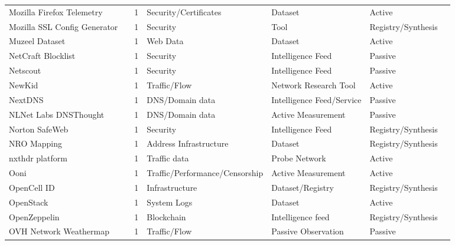 \documentclass[11pt,a4paper]{article}
\begin{document}
\begin{longtable}{@{}p{}p{}p{}p{}p{}p{}p{}@{}}
Mozilla Firefox Telemetry & \cite{mozillatelemetry} & 1 & Security/Certificates & Dataset & Active & \cite{10.1145/3777912.3839820} \\
Mozilla SSL Config Generator & \cite{sslgenerator} & 1 & Security & Tool & Registry/Synthesis & \cite{10.1007/978-3-031-28486-1_6} \\
Muzeel Dataset & \cite{10.1145/3517745.3561427} & 1 & Web Data & Dataset & Active & \cite{10.1145/3777912.3839817} \\
NetCraft Blocklist & \cite{netcraft} & 1 & Security & Intelligence Feed & Passive & \cite{10.1007/978-3-030-98785-5_1} \\
Netscout & \cite{netscout} & 1 & Security & Intelligence Feed & Passive & \cite{10.1145/3646547.3688451} \\
NewKid & \cite{10.1007/978-3-030-72582-2_16} & 1 & Traffic/Flow & Network Research Tool & Active & \cite{10.1145/3646547.3688451} \\
NextDNS & \cite{nextdns} & 1 & DNS/Domain data & Intelligence Feed/Service & Passive & \cite{10.1145/3730567.3764491} \\
NLNet Labs DNSThought & \cite{nlnet} & 1 & DNS/Domain data & Active Measurement & Passive & \cite{10.1007/978-3-031-28486-1_21} \\
Norton SafeWeb & \cite{norton} & 1 & Security & Intelligence Feed & Registry/Synthesis & \cite{10.1145/3777912.3839787} \\
NRO Mapping & \cite{nro} & 1 & Address Infrastructure & Dataset & Registry/Synthesis & \cite{10.1145/3777912.3809139} \\
nxthdr platform & \cite{nxthdr} & 1 & Traffic data & Probe Network & Active & \cite{10.1145/3777912.3839828} \\
Ooni & \cite{ooni} & 1 & Traffic/Performance/Censorship & Active Measurement & Active & \cite{10.1007/978-3-030-98785-5_23} \\
OpenCell ID & \cite{opencellid} & 1 & Infrastructure & Dataset/Registry & Registry/Synthesis & \cite{10.1007/978-3-030-72582-2_15} \\
OpenStack & \cite{10.1145/3133956.3134015} & 1 & System Logs & Dataset & Active & \cite{10.1007/978-3-032-18268-5_16} \\
OpenZeppelin & \cite{openzeppelin} & 1 & Blockchain & Intelligence feed & Registry/Synthesis & \cite{10.1145/3777912.3809150} \\
OVH Network Weathermap & \cite{ovhwm} & 1 & Traffic/Flow & Passive Observation & Passive & \cite{10.1145/3517745.3561462} \\

\end{longtable}
\end{document}
